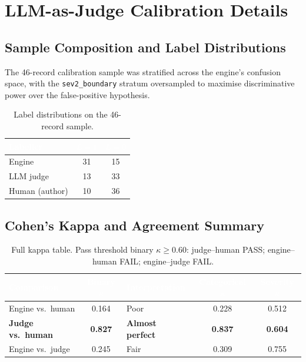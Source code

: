 \documentclass[11pt,a4paper]{article}
\newcommand{\hd}[1]{\textcolor{white}{\textbf{#1}}}   %
\newcommand{\code}[1]{\texttt{#1}}
\begin{document}
\section{LLM-as-Judge Calibration Details}
\label{app:b}

\subsection{Sample Composition and Label Distributions}

The 46-record calibration sample was stratified across the engine's confusion space, with the \code{sev2\_boundary} stratum oversampled to maximise discriminative power over the false-positive hypothesis.

\begin{table}[htbp]
\centering
{}
\begin{tabular}{@{} l c c @{}}
\toprule
\rowcolor{headblue}
\hd{Labeller} & \hd{$L=1$} & \hd{$L=0$} \\
\midrule
Engine          & 31 & 15 \\
LLM judge       & 13 & 33 \\
Human (author)  & 10 & 36 \\
\bottomrule
\end{tabular}
\caption{Label distributions on the 46-record sample.}
\end{table}

\subsection{Cohen's Kappa and Agreement Summary}

\begin{table}[htbp]
\centering
{}
\begin{tabular}{@{} l c l c c @{}}
\toprule
\rowcolor{headblue}
\hd{Comparison} & \hd{Binary $\kappa$} & \hd{Interpretation} & \hd{Categorical $\kappa$} & \hd{Severity $\kappa$} \\
\midrule
Engine vs.\ human          & 0.164          & Poor                    & 0.228          & 0.512 \\
\textbf{Judge vs.\ human}  & \textbf{0.827} & \textbf{Almost perfect} & \textbf{0.837} & \textbf{0.604} \\
Engine vs.\ judge          & 0.245          & Fair                    & 0.309          & 0.755 \\
\bottomrule
\end{tabular}
\caption{Full kappa table. Pass threshold binary $\kappa \geq 0.60$: judge--human PASS; engine--human FAIL; engine--judge FAIL.}
\end{table}
\end{document}
